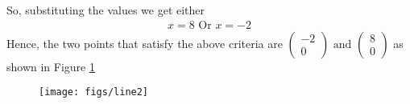 \documentclass[12pt]{article}
\newcommand{\myvec}[1]{\ensuremath{\begin{pmatrix}#1\end{pmatrix}}}
\begin{document}
So, substituting the values we get either
\begin{align}
	x = 8
	\text{ Or }
	x = -2
\end{align}
Hence, the two points that satisfy the above criteria are $\myvec{-2\\0} \text{ and } \myvec{8\\0}$ as shown in Figure \ref{fig:Fig1}	

\begin{figure}[!h]
	\begin{center} 
	    \texttt{[image: figs/line2]}
	\end{center}
\caption{}
\label{fig:Fig1}
\end{figure}
\end{document}
